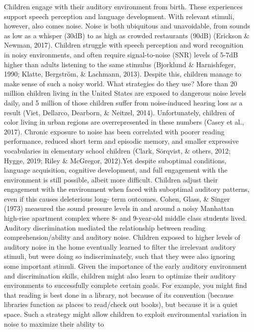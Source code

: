 \documentclass[10pt, letterpaper]{article}
\begin{document}
Children engage with their auditory environment from birth. These
experiences support speech perception and language development. With
relevant stimuli, however, also comes noise. Noise is both ubiquitous
and unavoidable, from sounds as low as a whisper (30dB) to as high as
crowded restaurants (90dB) (Erickson \& Newman, 2017). Children struggle
with speech perception and word recognition in noisy environments, and
often require signal-to-noise (SNR) levels of 5-7dB higher than adults
listening to the same stimulus (Bjorklund \& Harnishfeger, 1990; Klatte,
Bergström, \& Lachmann, 2013). Despite this, children manage to make
sense of such a noisy world. What strategies do they use? More than 20
million children living in the United States are exposed to dangerous
noise levels daily, and 5 million of those children suffer from
noise-induced hearing loss as a result (Viet, Dellarco, Dearborn, \&
Neitzel, 2014). Unfortunately, children of color living in urban regions
are overrepresented in these numbers (Casey et al., 2017). Chronic
exposure to noise has been correlated with poorer reading performance,
reduced short term and episodic memory, and smaller expressive
vocabularies in elementary school children (Clark, Sörqvist, \& others,
2012; Hygge, 2019; Riley \& McGregor, 2012).Yet despite suboptimal
conditions, language acquisition, cognitive development, and full
engagement with the environment is still possible, albeit more
difficult. Children adjust their engagement with the environment when
faced with suboptimal auditory patterns, even if this causes deleterious
long- term outcomes. Cohen, Glass, \& Singer (1973) measured the sound
pressure levels in and around a noisy Manhattan high-rise apartment
complex where 8- and 9-year-old middle class students lived. Auditory
discrimination mediated the relationship between reading
comprehension/ability and auditory noise. Children exposed to higher
levels of auditory noise in the home eventually learned to filter the
irrelevant auditory stimuli, but were doing so indiscriminately, such
that they were also ignoring some important stimuli. Given the
importance of the early auditory environment and discrimination skills,
children might also learn to optimize their auditory environments to
successfully complete certain goals. For example, you might find that
reading is best done in a library, not because of its convention
(because libraries function as places to read/check out books), but
because it is a quiet space. Such a strategy might allow children to
exploit environmental variation in noise to maximize their ability to
\end{document}
